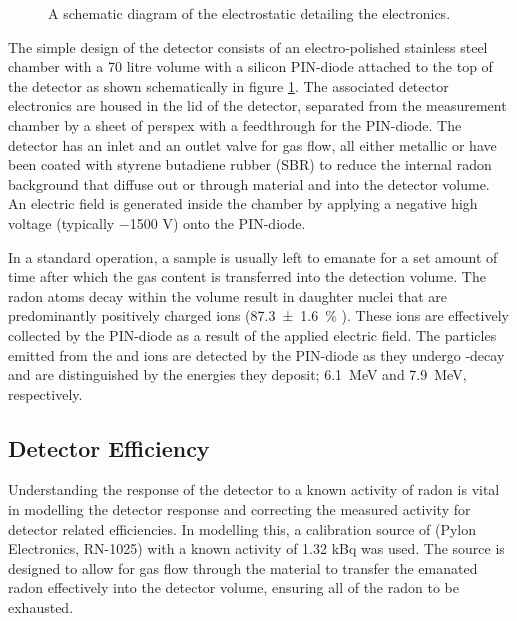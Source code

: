 \begin{figure}[h!]
    \caption[A schematic diagram of the electrostatic detailing the electronics.]
    {A schematic diagram of the electrostatic detailing the electronics.}
    \label{fig:elecrostatic_detector_schematic}
\end{figure}
%

The simple design of the detector consists of an electro-polished stainless steel chamber with a 70 litre volume with a silicon PIN-diode attached to the top of the detector as shown schematically in figure \ref{fig:elecrostatic_detector_schematic}. The associated detector electronics are housed in the lid of the detector, separated from the measurement chamber by a sheet of perspex with a feedthrough for the PIN-diode. The detector has an inlet and an outlet valve for gas flow, all either metallic or have been coated with styrene butadiene rubber (SBR) to reduce the internal radon background that diffuse out or through material and into the detector volume. An electric field is generated inside the chamber by applying a negative high voltage (typically −1500 V) onto the PIN-diode.
 
In a standard operation, a sample is usually left to emanate for a set amount of time after which the gas content is transferred into the detection volume. The radon atoms decay within the volume result in daughter nuclei that are predominantly positively charged ions (\SI{87.3\pm1.6}{\percent} \cite{PAGELKOPF20031057}). These ions are effectively collected by the PIN-diode as a result of the applied electric field. The \alpha{} particles emitted from the \potoe{} and \potof{} ions are detected by the PIN-diode as they undergo \alpha{}-decay and are distinguished by the energies they deposit; \SI{6.1}{\mega\electronvolt} and \SI{7.9}{\mega\electronvolt}, respectively. 


\subsection{Detector Efficiency}
\label{sec:detector_efficiency}

Understanding the response of the detector to a known activity of radon is vital in modelling the detector response and correcting the measured activity for detector related efficiencies. In modelling this, a calibration source of \RaTTS{} (Pylon Electronics, RN-1025) with a known activity of 1.32 kBq was used. The source is designed to allow for gas flow through the material to transfer the emanated radon effectively into the detector volume, ensuring all of the radon to be exhausted.

